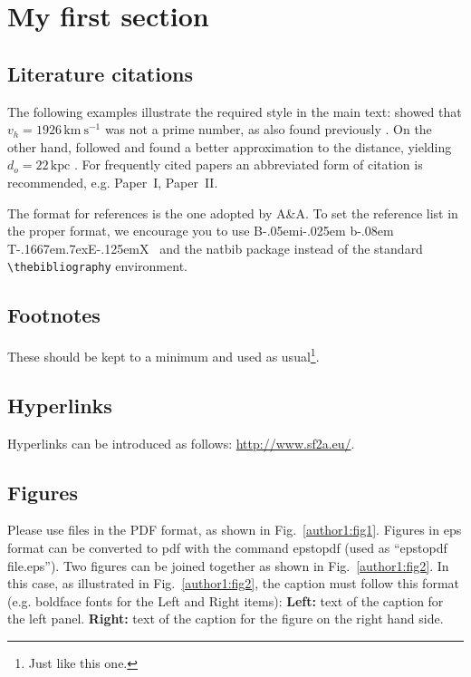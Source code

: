 \documentclass{sf2a-conf2023}
\def\BibTeX{{\rm B\kern-.05em{\sc i\kern-.025em b}\kern-.08em
    T\kern-.1667em\lower.7ex\hbox{E}\kern-.125emX}}
\newcommand{\kms}{{\mathrm{km~s^{-1}}}}
\newcommand{\kpc}{{\mathrm{kpc}}}
\begin{document}
\section{My first section}


\subsection{ Literature citations}
 
The following examples illustrate the required style in the main text:
 \cite{Einstein26} showed that $v_h = 1926 \, \kms$ was not a prime number, as
 also found previously \citep{Laurel24}. On the other hand, 
  \citet{1945RvMP...17..120E} followed 
\citet{Kafka24} and found a better approximation to the
distance, yielding $d_o = 22 \, \kpc$ \citep[see also][and references therein]{Bohr26,Curie91,deGaulle96}. 
For frequently cited papers an abbreviated form of citation is
 recommended, e.g. Paper~I, Paper~II.

The format for references is the one adopted by A\&A. To set the reference list in the proper format, we encourage you to use \BibTeX~ and the natbib package instead of the standard \verb=\thebibliography= environment.

\subsection{Footnotes}

These should be kept to a minimum and used as 
usual\footnote{Just like this one.}.


\subsection{Hyperlinks}

Hyperlinks can be introduced as follows: \url{http://www.sf2a.eu/}.

\subsection{Figures}

Please use files in the PDF format, as shown in Fig.~\ref{author1:fig1}. Figures in eps format can be converted to pdf with the command epstopdf (used as ``epstopdf file.eps''). Two figures can be joined together as shown in Fig.~\ref{author1:fig2}. In this case, as illustrated in Fig.~\ref{author1:fig2}, 
the caption must follow this format (e.g. boldface fonts for the Left and Right items): \textbf{Left:} text
of the caption for the left panel. \textbf{Right:} text of the caption for the figure on the right hand side. 
\end{document}
